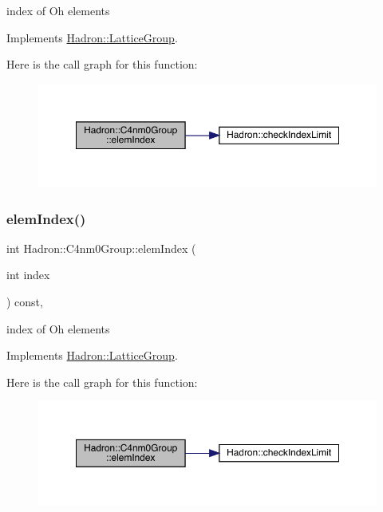 index of Oh elements 

Implements \mbox{\hyperlink{structHadron_1_1LatticeGroup_afb8e3ee60de059f75bce1044c694e1e8}{Hadron\+::\+Lattice\+Group}}.

Here is the call graph for this function\+:
\nopagebreak
\begin{figure}[H]
\begin{center}
\leavevmode
\includegraphics[width=350pt]{da/da1/structHadron_1_1C4nm0Group_a700a48f1865a634b774127d8710e1ecc_cgraph}
\end{center}
\end{figure}
\mbox{\label{structHadron_1_1C4nm0Group_a700a48f1865a634b774127d8710e1ecc}} 
\subsubsection{\texorpdfstring{elemIndex()}{elemIndex()}\hspace{0.1cm}{\footnotesize\ttfamily [3/3]}}
{\footnotesize\ttfamily int Hadron\+::\+C4nm0\+Group\+::elem\+Index (\begin{DoxyParamCaption}\item[{int}]{index }\end{DoxyParamCaption}) const\hspace{0.3cm}{\ttfamily [inline]}, {\ttfamily [virtual]}}

index of Oh elements 

Implements \mbox{\hyperlink{structHadron_1_1LatticeGroup_afb8e3ee60de059f75bce1044c694e1e8}{Hadron\+::\+Lattice\+Group}}.

Here is the call graph for this function\+:
\nopagebreak
\begin{figure}[H]
\begin{center}
\leavevmode
\includegraphics[width=350pt]{da/da1/structHadron_1_1C4nm0Group_a700a48f1865a634b774127d8710e1ecc_cgraph}
\end{center}
\end{figure}
\mbox{\label{structHadron_1_1C4nm0Group_a2a84060776245ed0045a7271b00064eb}} 
